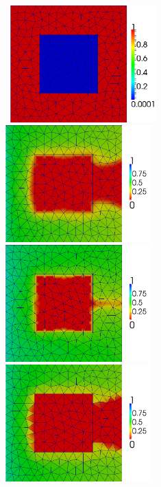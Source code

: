 \begin{figure}[h]
\vbox{
\hbox{
\hspace{3.5cm} \includegraphics[width=0.5\textwidth]{square_permeability_low}}
\vspace{0.5cm}
\hbox{
\hspace{-0.cm}\includegraphics[width=0.5\textwidth]{cg_square_015_low}
\hspace{-0.cm}\includegraphics[width=0.5\textwidth]{cg_square_05_low}}
\vspace{0.5cm}
\hbox{
\hspace{-0.cm}\includegraphics[width=0.5\textwidth]{dg_square_015_low}
}}
\end{figure}
